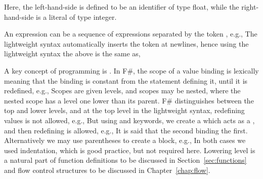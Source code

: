 %
%
%
Here, the left-hand-side is defined to be an identifier of type float, while the right-hand-side is a literal of type integer.

An expression can be a sequence of expressions separated by the token \token{;}, e.g.,
%
%
The lightweight syntax automatically inserts the \token{;} token at newlines, hence using the lightweight syntax the above is the same as,
%
%

A key concept of programming is . In F\#, the scope of a value binding is lexically meaning that the binding is constant from the  statement defining it, until it is redefined, e.g.,
%
%
Scopes are given levels, and scopes may be nested, where the nested scope has a level one lower than its parent. F\# distinguishes between the top and lower levels, and at the top level in the lightweight syntax, redefining values is not allowed, e.g.,
%
%
But using  and  keywords, we create a  which acts as a , and then redefining is allowed, e.g.,
%
%
It is said that the second binding  the first.
Alternatively we may use parentheses to create a block, e.g.,
%
%
In both cases we used indentation, which is good practice, but not required here.  Lowering level is a natural part of function definitions to be discussed in Section~\ref{sec:functions} and flow control structures to be discussed in Chapter~\ref{chap:flow}.

